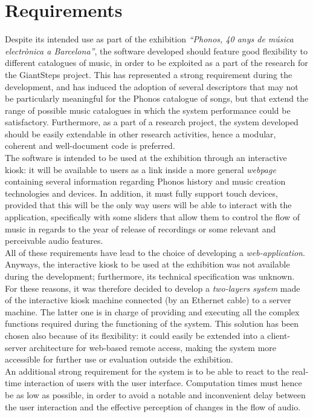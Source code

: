 \section{Requirements}
\label{sec:requirements}
Despite its intended use as part of the exhibition \textit{``Phonos, 40 anys de música electrònica a Barcelona''}, the software developed should feature good flexibility to different catalogues of music, in order to be exploited as a part of the research for the GiantSteps project. This has represented a strong requirement during the development, and has induced the adoption of several descriptors that may not be particularly meaningful for the Phonos catalogue of songs, but that extend the range of possible music catalogues in which the system performance could be satisfactory. Furthermore, as a part of a research project, the system developed should be easily extendable in other research activities, hence a modular, coherent and well-document code is preferred. \\
The software is intended to be used at the exhibition through an interactive kiosk: it will be available to users as a link inside a more general \textit{webpage} containing several information regarding Phonos history and music creation technologies and devices. In addition, it must fully support touch devices, provided that this will be the only way users will be able to interact with the application, specifically with some sliders that allow them to control the flow of music in regards to the year of release of recordings or some relevant and perceivable audio features. \\ 
All of these requirements have lead to the choice of developing a \textit{web-application}. 
Anyways, the interactive kiosk to be used at the exhibition was not available during the development; furthermore, its technical specification was unknown. For these reasons, it was therefore decided to develop a \textit{two-layers system} made of the interactive kiosk machine connected (by an Ethernet cable) to a server machine. The latter one is in charge of providing and executing all the complex functions required during the functioning of the system. This solution has been chosen also because of its flexibility: it could easily be extended into a client-server architecture for web-based remote access, making the system more accessible for further use or evaluation outside the exhibition. \\
An additional strong requirement for the system is to be able to react to the real-time interaction of users with the user interface. Computation times must hence be as low as possible, in order to avoid a notable and inconvenient delay between the user interaction and the effective perception of changes in the flow of audio. \\
